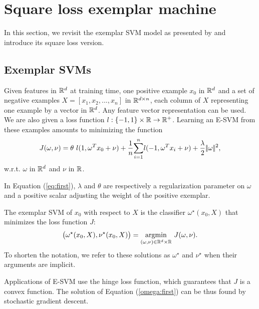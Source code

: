 \section{Square loss exemplar machine}\label{lsesvm}
In this section, we revisit the exemplar SVM model as presented by \cite{Efros11} and introduce its square loss version.
\subsection{Exemplar SVMs} \label{esvm}
Given features in $\mathbb R^d$ at training time, one positive example $x_0$ in $\mathbb R^d$ and a set of negative examples $X = [x_1, x_2,...,x_n]$ in $\mathbb R^{d\times n}$, each column of $X$ representing one example by a vector in $\mathbb R^d$. 
Any feature vector representation can be used.
We are also given a loss function $l:\{-1, 1\}\times \mathbb R\rightarrow\mathbb R^+$. Learning an E-SVM from these examples amounts to minimizing the function 
\begin{equation}
J(\omega, \nu) = \theta \ l(1, \omega^Tx_0+\nu) +\dfrac{1}{n}\displaystyle{\sum_{i=1}^n} l(-1, \omega^T x_i+\nu)+\dfrac{\lambda}{2}|\!|\omega|\!|^2, \label{eq:first}
\end{equation}
w.r.t. $\omega$ in $\mathbb R^d$ and $\nu$ in $\mathbb R$.

In Equation (\ref{eq:first}), $\lambda$ and $\theta$ are respectively a regularization parameter on $\omega$ and a positive scalar adjusting the weight of the positive exemplar.

The  exemplar SVM of $x_0$ with respect to $X$ is the classifier $\omega^\star(x_0,X)$ that minimizes the loss function $J$:
\begin{equation}
\big(\omega^\star(x_0, X), \nu^\star(x_0, X)\big) = \underset{(\omega,\nu)\in\mathbb R^d\times\mathbb R}{\operatorname*{argmin}} \ J(\omega, \nu). \label{omega:first}
\end{equation}
To shorten the notation, we refer to these solutions as $\omega^\star$ and $\nu^\star$ when their arguments are implicit.

Applications of E-SVM use the hinge loss function, which guarantees that $J$ is a convex function. The solution of Equation (\ref{omega:first}) can be thus found by stochastic gradient descent.

